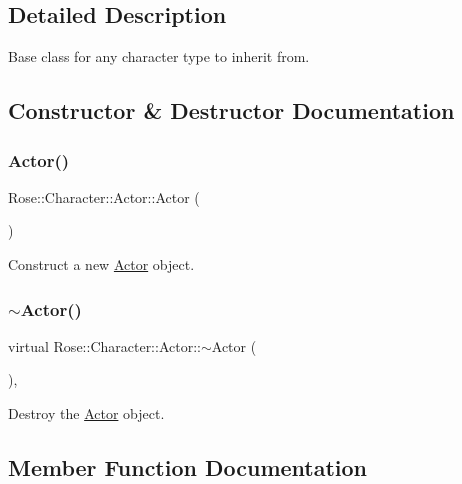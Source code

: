 \subsection{Detailed Description}
Base class for any character type to inherit from. 



\subsection{Constructor \& Destructor Documentation}
\mbox{\label{classRose_1_1Character_1_1Actor_a49b83c9e65da067866238127affa120a}} 
\subsubsection{\texorpdfstring{Actor()}{Actor()}}
{\footnotesize\ttfamily Rose\+::\+Character\+::\+Actor\+::\+Actor (\begin{DoxyParamCaption}{ }\end{DoxyParamCaption})}



Construct a new \mbox{\hyperlink{classRose_1_1Character_1_1Actor}{Actor}} object. 

\mbox{\label{classRose_1_1Character_1_1Actor_ae8e15757a90d2195048964e6bbf8487b}} 
\subsubsection{\texorpdfstring{$\sim$Actor()}{~Actor()}}
{\footnotesize\ttfamily virtual Rose\+::\+Character\+::\+Actor\+::$\sim$\+Actor (\begin{DoxyParamCaption}{ }\end{DoxyParamCaption})\hspace{0.3cm}{\ttfamily [virtual]}, {\ttfamily [default]}}



Destroy the \mbox{\hyperlink{classRose_1_1Character_1_1Actor}{Actor}} object. 



\subsection{Member Function Documentation}
\mbox{\label{classRose_1_1Character_1_1Actor_a8d835beb192c864967c7a9b3a5f7f579}} 
